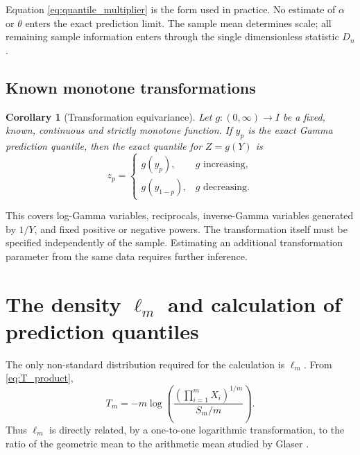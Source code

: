 \documentclass[11pt]{article}
\newtheorem{corollary}[theorem]{Corollary}
\theoremstyle{remark}
\begin{document}
Equation \eqref{eq:quantile_multiplier} is the form used in practice. No estimate of $\alpha$ or $\theta$ enters the exact prediction limit. The sample mean determines scale; all remaining sample information enters through the single dimensionless statistic $D_n$.

\subsection{Known monotone transformations}

\begin{corollary}[Transformation equivariance]
Let $g:(0,\infty)\to I$ be a fixed, known, continuous and strictly monotone function. If $y_p$ is the exact Gamma prediction quantile, then the exact quantile for $Z=g(Y)$ is
\begin{equation}
 z_p=\begin{cases}
 g(y_p),&g\text{ increasing},\\
 g(y_{1-p}),&g\text{ decreasing}.
 \end{cases}
 \label{eq:transformation}
\end{equation}
\end{corollary}

This covers log-Gamma variables, reciprocals, inverse-Gamma variables generated by $1/Y$, and fixed positive or negative powers. The transformation itself must be specified independently of the sample. Estimating an additional transformation parameter from the same data requires further inference.

\section{The density \texorpdfstring{$\ell_m$}{ell-m} and calculation of prediction quantiles}
\label{sec:numerics}

The only non-standard distribution required for the calculation is $\ell_m$. From \eqref{eq:T_product},
\[
 T_m=-m\log\!\left(
 \frac{(\prod_{i=1}^m X_i)^{1/m}}{S_m/m}
 \right).
\]
Thus $\ell_m$ is directly related, by a one-to-one logarithmic transformation, to the ratio of the geometric mean to the arithmetic mean studied by Glaser \cite{Glaser1976}.
\end{document}
